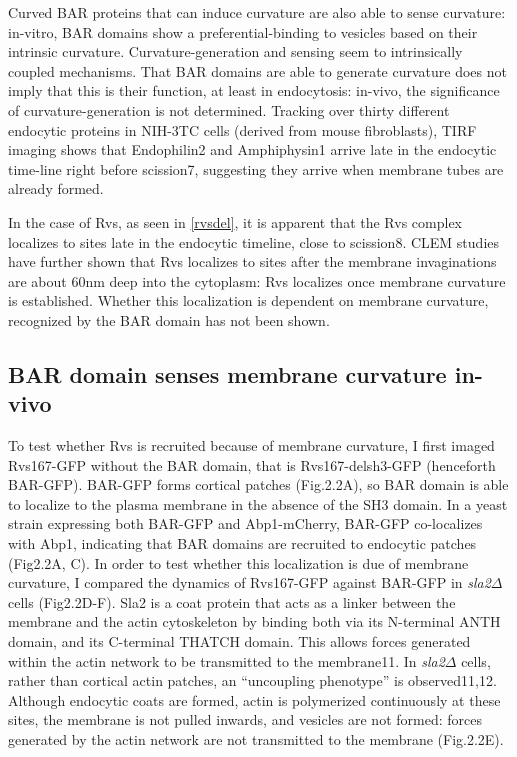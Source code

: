 	\vspace{5mm}
	Curved BAR proteins that can induce curvature are also able to sense curvature: in-vitro, BAR domains show a preferential-binding to vesicles based on their intrinsic curvature. Curvature-generation and sensing seem to intrinsically coupled mechanisms. That BAR domains are able to generate curvature does not imply that this is their function, at least in endocytosis: in-vivo, the significance of curvature-generation is not determined. Tracking over thirty different endocytic proteins in NIH-3TC cells (derived from mouse fibroblasts), TIRF imaging shows that Endophilin2 and Amphiphysin1 arrive late in the endocytic time-line right before scission7, suggesting they arrive when membrane tubes are already formed. 


	\vspace{5mm}
	In the case of Rvs, as seen in \ref{rvsdel}, it is apparent that the Rvs complex localizes to sites late in the endocytic timeline, close to scission8. CLEM studies have further shown that Rvs localizes to sites after the membrane invaginations are about 60nm deep into the cytoplasm: Rvs localizes once membrane curvature is established. Whether this localization is dependent on membrane curvature, recognized by the BAR domain has not been shown. 



	\subsection{BAR domain senses membrane curvature in-vivo}
	To test whether Rvs is recruited because of membrane curvature, I first imaged Rvs167-GFP without the BAR domain, that is Rvs167-delsh3-GFP (henceforth BAR-GFP). BAR-GFP forms cortical patches (Fig.2.2A), so BAR domain is able to localize to the plasma membrane in the absence of the SH3 domain. In a yeast strain expressing both BAR-GFP and Abp1-mCherry, BAR-GFP co-localizes with Abp1, indicating that BAR domains are recruited to endocytic patches (Fig2.2A, C). In order to test whether this localization is due of membrane curvature, I compared the dynamics of Rvs167-GFP against BAR-GFP in \textit{sla2$\Delta$} cells (Fig2.2D-F). Sla2 is a coat protein that acts as a linker between the membrane and the actin cytoskeleton by binding both via its N-terminal ANTH domain, and its C-terminal THATCH domain. This allows forces generated within the actin network to be transmitted to the membrane11. In \textit{sla2$\Delta$} cells, rather than cortical actin patches, an “uncoupling phenotype” is observed11,12. Although endocytic coats are formed, actin is polymerized continuously at these sites, the membrane is not pulled inwards, and vesicles are not formed: forces generated by the actin network are not transmitted to the membrane (Fig.2.2E).

